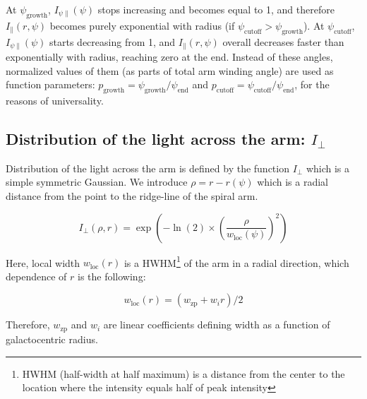 \documentclass[12pt,a4paper]{article}
\begin{document}
At $\psi_\text{growth}$, $I_{\psi \parallel}(\psi)$ stops increasing and becomes equal to 1, and therefore $I_\parallel(r, \psi)$ becomes purely exponential with radius (if $\psi_\text{cutoff} > \psi_\text{growth}$). At $\psi_\text{cutoff}$, $I_{\psi \parallel}(\psi)$ starts decreasing from 1, and $I_\parallel(r, \psi)$ overall decreases faster than exponentially with radius, reaching zero at the end. Instead of these angles, normalized values of them (as parts of total arm winding angle) are used as function parameters: $p_\text{growth} = \psi_\text{growth} / \psi_\text{end}$ and $p_\text{cutoff} = \psi_\text{cutoff} / \psi_\text{end}$, for the reasons of universality.


\subsection{Distribution of the light across the arm: $I_\bot$}

Distribution of the light across the arm is defined by the function $I_\bot$ which is a simple symmetric Gaussian. We introduce $\rho = r - r(\psi)$ which is a radial distance from the point to the ridge-line of the spiral arm.

\begin{equation}
	\label{eq:I_bot}
	I_\bot(\rho, r) = \exp \left(-\ln(2) \times \left( \frac{\rho}{w_\text{loc}(\psi)} \right)^2 \right)
\end{equation}

Here, local width $w_\text{loc}(r)$ is a HWHM\footnote{HWHM (half-width at half maximum) is a distance from the center to the location where the intensity equals half of peak intensity} of the arm in a radial direction, which dependence of $r$ is the following:

\begin{equation}
	\label{eq:w_loc}
	w_\text{loc}(r) = (w_\text{zp} + w_i r) / 2
\end{equation}

Therefore, $w_\text{zp}$ and $w_i$ are linear coefficients defining width as a function of galactocentric radius.
\end{document}
